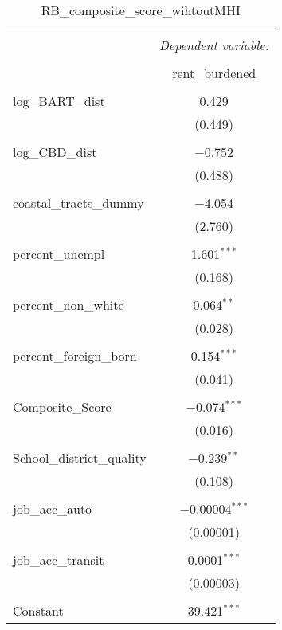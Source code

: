 \documentclass[10pt, letterpaper]{amsart}
\begin{document}
\begin{table}[!htbp] \centering 
  \caption{RB\_composite\_score\_wihtoutMHI} 
  \label{} 
  \begin{tabular}{@{\extracolsep{5pt}}lc} 
    \\[-1.8ex]\hline 
    \hline \\[-1.8ex] 
    & \multicolumn{1}{c}{\textit{Dependent variable:}} \\ 
    \cline{2-2} 
    \\[-1.8ex] & rent\_burdened \\ 
    \hline \\[-1.8ex] 
    log\_BART\_dist & 0.429 \\ 
    & (0.449) \\ 
    & \\ 
    log\_CBD\_dist & $-$0.752 \\ 
    & (0.488) \\ 
    & \\ 
    coastal\_tracts\_dummy & $-$4.054 \\ 
    & (2.760) \\ 
    & \\ 
    percent\_unempl & 1.601$^{***}$ \\ 
    & (0.168) \\ 
    & \\ 
    percent\_non\_white & 0.064$^{**}$ \\ 
    & (0.028) \\ 
    & \\ 
    percent\_foreign\_born & 0.154$^{***}$ \\ 
    & (0.041) \\ 
    & \\ 
    Composite\_Score & $-$0.074$^{***}$ \\ 
    & (0.016) \\ 
    & \\ 
    School\_district\_quality & $-$0.239$^{**}$ \\ 
    & (0.108) \\ 
    & \\ 
    job\_acc\_auto & $-$0.00004$^{***}$ \\ 
    & (0.00001) \\ 
    & \\ 
    job\_acc\_transit & 0.0001$^{***}$ \\ 
    & (0.00003) \\ 
    & \\ 
    Constant & 39.421$^{***}$ \\ 

\end{tabular}
\end{table}
\end{document}
